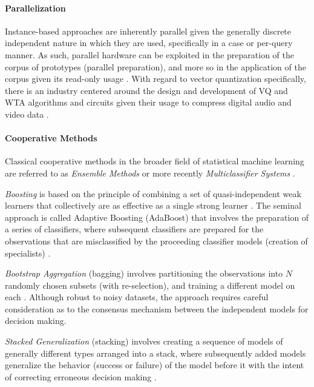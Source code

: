 \paragraph{Parallelization} 
Instance-based approaches are inherently parallel given the generally discrete independent nature in which they are used, specifically in a case or per-query manner. As such, parallel hardware can be exploited in the preparation of the corpus of prototypes (parallel preparation), and more so in the application of the corpus given its read-only usage \cite{Aamodt1994, Nagendra1996, Plaza1997}. With regard to vector quantization specifically, there is an industry centered around the design and development of VQ and WTA algorithms and circuits given their usage to compress digital audio and video data \cite{Nakada1999, Parhi1994}.
	
\paragraph{Cooperative Methods}
Classical cooperative methods in the broader field of statistical machine learning are referred to as \emph{Ensemble Methods} \cite{Opitz1999, Polikar2006} or more recently \emph{Multiclassifier Systems} \cite{Ghosh2002}. 

\emph{Boosting} is based on the principle of combining a set of quasi-independent weak learners that collectively are as effective as a single strong learner \cite{Kearns1988, Schapire1992}. The seminal approach is called Adaptive Boosting (AdaBoost) that involves the preparation of a series of classifiers, where subsequent classifiers are prepared for the observations that are misclassified by the proceeding classifier models (creation of specialists) \cite{Schapire2003}. 

\emph{Bootstrap Aggregation} (bagging) involves partitioning the observations into $N$ randomly chosen subsets (with re-selection), and training a different model on each \cite{Breiman1996}. Although robust to noisy datasets, the approach requires careful consideration as to the consensus mechanism between the independent models for decision making. 

\emph{Stacked Generalization} (stacking) involves creating a sequence of models of generally different types arranged into a stack, where subsequently added models generalize the behavior (success or failure) of the model before it with the intent of correcting erroneous decision making \cite{Wolpert1992, Ting1999}. 
	
